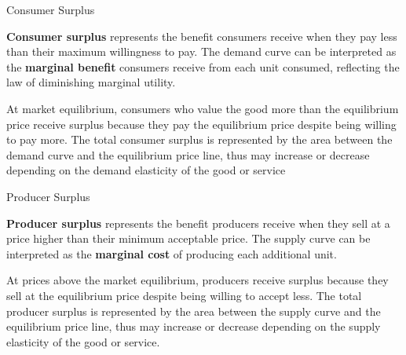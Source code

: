 \documentclass[10pt]{article}
\begin{document}
    \begin{core}{Consumer Surplus}

      \textbf{Consumer surplus} represents the benefit consumers receive when they pay less than their maximum willingness to pay. The demand curve can be interpreted as the \textbf{marginal benefit} consumers receive from each unit consumed, reflecting the law of diminishing marginal utility.


      At market equilibrium, consumers who value the good more than the equilibrium price receive surplus because they pay the equilibrium price despite being willing to pay more. The total consumer surplus is represented by the area between the demand curve and the equilibrium price line, thus may increase or decrease depending on the demand elasticity of the good or service

    \end{core}

    \begin{core}{Producer Surplus}

      \textbf{Producer surplus} represents the benefit producers receive when they sell at a price higher than their minimum acceptable price. The supply curve can be interpreted as the \textbf{marginal cost} of producing each additional unit.


      At prices above the market equilibrium, producers receive surplus because they sell at the equilibrium price despite being willing to accept less. The total producer surplus is represented by the area between the supply curve and the equilibrium price line, thus may increase or decrease depending on the supply elasticity of the good or service.

    \end{core}
\end{document}
